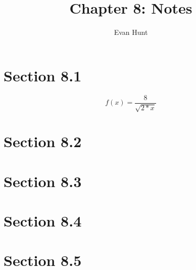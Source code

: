 \documentclass[12pt]{article}
\title{Chapter 8: Notes}
\author{Evan Hunt}
\begin{document}
    \maketitle

    \section[]{Section 8.1}
        \begin{equation}
            f(x) = \frac{8}{\sqrt{2*x}}
        \end{equation}
    \section[]{Section 8.2}
    \section[]{Section 8.3}
    \section[]{Section 8.4}
    \section[]{Section 8.5}
\end{document}
